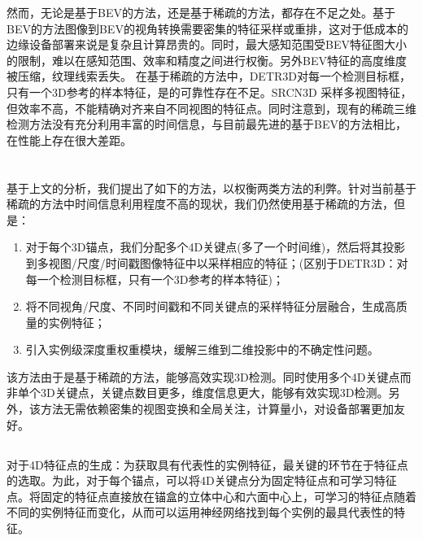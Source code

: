\documentclass[12pt, twocolumn]{article}
\newcommand\normf{\fangsong}
\begin{document}
	然而，无论是基于BEV的方法，还是基于稀疏的方法，都存在不足之处。基于BEV的方法图像到BEV的视角转换需要密集的特征采样或重排，这对于低成本的边缘设备部署来说是复杂且计算昂贵的。同时，最大感知范围受BEV特征图大小的限制，难以在感知范围、效率和精度之间进行权衡。另外BEV特征的高度维度被压缩，纹理线索丢失。
	在基于稀疏的方法中，DETR3D对每一个检测目标框，只有一个3D参考的样本特征，是的可靠性存在不足。SRCN3D \cite{shi2022srcn3d} 采样多视图特征，但效率不高，不能精确对齐来自不同视图的特征点。同时注意到，现有的稀疏三维检测方法没有充分利用丰富的时间信息，与目前最先进的基于BEV的方法相比，在性能上存在很大差距。
	
	\section{\normf{方法设计}}
	\subsection{\normf{方案设想}}
	基于上文的分析，我们提出了如下的方法，以权衡两类方法的利弊。针对当前基于稀疏的方法中时间信息利用程度不高的现状，我们仍然使用基于稀疏的方法，但是：
	\begin{enumerate}
	\item 对于每个3D锚点，我们分配多个4D关键点(多了一个时间维)，然后将其投影到多视图/尺度/时间戳图像特征中以采样相应的特征；(区别于DETR3D：对每一个检测目标框，只有一个3D参考的样本特征)；
	
	\item 将不同视角/尺度、不同时间戳和不同关键点的采样特征分层融合，生成高质量的实例特征；
	
	\item 引入实例级深度重权重模块，缓解三维到二维投影中的不确定性问题。
	\end{enumerate}
	
	该方法由于是基于稀疏的方法，能够高效实现3D检测。同时使用多个4D关键点而非单个3D关键点，关键点数目更多，维度信息更大，能够有效实现3D检测。另外，该方法无需依赖密集的视图变换和全局关注，计算量小，对设备部署更加友好。
	
	\subsection{\normf{关键技术和可行性}}
	对于4D特征点的生成：为获取具有代表性的实例特征，最关键的环节在于特征点的选取。为此，对于每个锚点，可以将4D关键点分为固定特征点和可学习特征点。将固定的特征点直接放在锚盒的立体中心和六面中心上，可学习的特征点随着不同的实例特征而变化，从而可以运用神经网络找到每个实例的最具代表性的特征。
	
\end{document}
